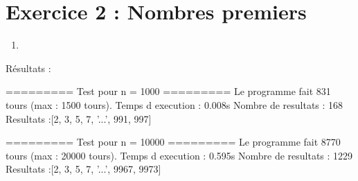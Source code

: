 \section{Exercice 2 : Nombres premiers}
\begin{enumerate}
  \item
\end{enumerate}


Résultats :
\begin{code}
  ========= Test pour n = 1000 =========
  Le programme fait 831 tours (max : 1500 tours).
  Temps d execution : 0.008s
  Nombre de resultats : 168
  Resultats :[2, 3, 5, 7, '...', 991, 997]

  ========= Test pour n = 10000 =========
  Le programme fait 8770 tours (max : 20000 tours).
  Temps d execution : 0.595s
  Nombre de resultats : 1229
  Resultats :[2, 3, 5, 7, '...', 9967, 9973]
\end{code}
